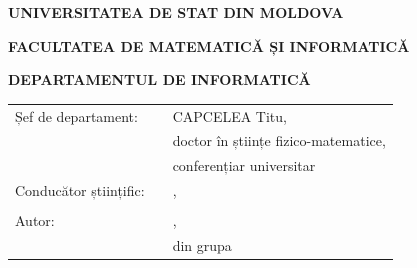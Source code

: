 \sloppy

\begin{titlepage}
  \titlePageDefaultFont
  \vspace*{\fill}
  \begin{center}
      \vspace*{1cm}

      {\titlePageEmphasisFont
      \uppercase{\textbf{UNIVERSITATEA DE STAT DIN MOLDOVA\\}}}

      \uppercase{\textbf{FACULTATEA DE MATEMATICĂ și INFORMATICĂ}}
      \vspace{0.1cm}

      \uppercase{\textbf{DEPARTAMENTUL DE INFORMATICĂ}}
      \vspace{3.0cm}

      {\titlePageEmphasisFont
      \textbf{\correctName{\authorName}}}
      \vspace{1.5cm}

      {\titlePageEmphasisFont
      }
      \vspace{0.75cm}

      \textbf{\MakeUppercase{\identificatorulCursului{}}}
      \vspace{0.5cm}

  
    \end{center}
  \vfill

  \begin{flushleft}
    \newcommand{\signatureField}{\textUnderLine{4cm}{(semnătură)}}

    \begin{tabular}{@{}p{4.5cm} p{4cm} p{7.5cm}@{}}
      Șef de departament:      & \signatureField{} & CAPCELEA Titu, \\
                               &                   & doctor în științe fizico-matematice, \\
                               &                   & conferențiar universitar \\
      Conducător științific:   & \signatureField{} & \correctName{\conducatorName}, \\
                               &                   & \conducatorTitleRo{} \\
      Autor:                   & \signatureField{} & \correctName{\authorName}, \\
                               &                   & \studentTypeRo{} din grupa \uniGroupName{} \\
    \end{tabular}
      

\end{flushleft}
\end{titlepage}
